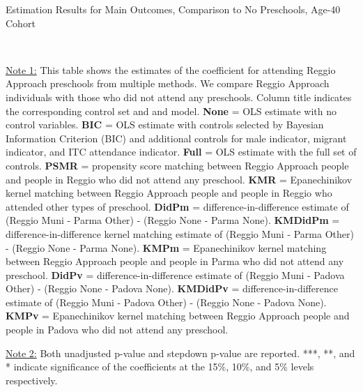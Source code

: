 \begin{table}[H] \caption{Estimation Results for Main Outcomes, Comparison to No Preschools, Age-40 Cohort} \label{ols-M-adult40-reg-nopres}
\scalebox{0.6}{}
\vspace{1ex} \\
\footnotesize\raggedright{\underline{Note 1:} This table shows the estimates of the coefficient for attending Reggio Approach preschools from multiple methods. We compare Reggio Approach individuals with those who did not attend any preschools. Column title indicates the corresponding control set and and model. \textbf{None} = OLS estimate with no control variables. \textbf{BIC} = OLS estimate with controls selected by Bayesian Information Criterion (BIC) and additional controls for male indicator, migrant indicator, and ITC attendance indicator. \textbf{Full} = OLS estimate with the full set of controls. \textbf{PSMR} =  propensity score matching between Reggio Approach people and people in Reggio who did not attend any preschool. \textbf{KMR} = Epanechinikov kernel matching between Reggio Approach people and people in Reggio who attended other types of preschool. \textbf{DidPm} = difference-in-difference estimate of (Reggio Muni - Parma Other) - (Reggio None - Parma None).  \textbf{KMDidPm} = difference-in-difference kernel matching estimate of (Reggio Muni - Parma Other) - (Reggio None - Parma None).  \textbf{KMPm} = Epanechinikov kernel matching between Reggio Approach people and people in Parma who did not attend any preschool. \textbf{DidPv} = difference-in-difference estimate of (Reggio Muni - Padova Other) - (Reggio None - Padova None). \textbf{KMDidPv} = difference-in-difference estimate of (Reggio Muni - Padova Other) - (Reggio None - Padova None).  \textbf{KMPv} = Epanechinikov kernel matching between Reggio Approach people and people in Padova who did not attend any preschool.}

\footnotesize\raggedright{\underline{Note 2:} Both unadjusted p-value and stepdown p-value are reported. ***, **, and * indicate significance of the coefficients at the 15\%, 10\%, and 5\% levels respectively.}
\end{table}


